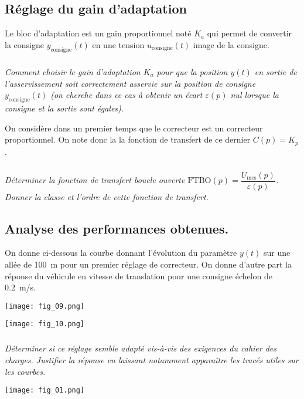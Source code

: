 \begin{multicols}{2}
\subsection*{Réglage du gain d’adaptation}

Le bloc d’adaptation est un gain proportionnel noté $K_a$ qui permet de convertir la consigne $y_{\text{consigne}}(t)$ en une tension $u_{\text{consigne}}(t)$ image de la consigne.  



\subparagraph{}
\textit{Comment choisir le gain d’adaptation $K_a$ pour que la position $y(t)$ en sortie de l’asservissement soit correctement asservie sur la position de consigne $y_{\text{consigne}} (t)$ (on cherche dans ce cas à obtenir un écart $\varepsilon(p)$ nul lorsque la consigne et la sortie sont égales).}
\ifprof
\begin{corrige}
\end{corrige}
\else
\fi

On considère dans un premier temps que le correcteur est un correcteur proportionnel. On note donc la la fonction de transfert de ce dernier $C(p) = K_p$.


\subparagraph{}
\textit{Déterminer la fonction de transfert boucle ouverte $\text{FTBO}(p)=\dfrac{U_{\text{mes}} (p)}{\varepsilon(p)}$.
Donner la classe et l’ordre de cette fonction de transfert. }
\ifprof
\begin{corrige}
\end{corrige}
\else
\fi

\subsection*{Analyse des performances obtenues.}
\ifprof
\else
On donne ci-dessous la courbe donnant l’évolution du paramètre $y(t)$ sur une allée de \SI{100}{m} pour un premier réglage de correcteur. On donne d’autre part la réponse du véhicule en vitesse de translation pour une consigne échelon de \SI{0,2}{m/s}. 

\begin{center}
\texttt{[image: fig\_09.png]}
\end{center}


\begin{center}
\texttt{[image: fig\_10.png]}
\end{center}

\fi

\subparagraph{}
\textit{Déterminer si ce réglage semble adapté vis-à-vis des exigences du cahier des charges. Justifier la réponse en laissant notamment apparaître les tracés utiles sur les courbes. }
\ifprof
\begin{corrige}
\end{corrige}
\else
\fi

\end{multicols}

\ifprof
\else
\begin{center}
\texttt{[image: fig\_01.png]}
\end{center}
\fi